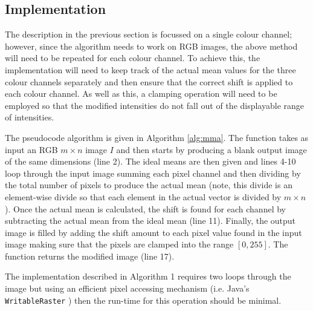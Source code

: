 \documentclass[journal,transmag]{IEEEtran}
\begin{document}
\subsection{Implementation}

The description in the previous section is focussed on a single colour channel; however, since the algorithm needs to work on RGB images, the above method will need to be repeated for each colour channel.  To achieve this, the implementation will need to keep track of the actual mean values for the three colour channels separately and then ensure that the correct shift is applied to each colour channel.  As well as this, a clamping operation will need to be employed so that the modified intensities do not fall out of the displayable range of intensities.

The pseudocode algorithm is given in Algorithm \ref{alg:mma}.  The function takes as input an RGB $m \times n$ image $I$ and then starts by producing a blank output image of the same dimensions (line 2).  The ideal means are then given and lines 4-10 loop through the input image summing each pixel channel and then dividing by the total number of pixels to produce the actual mean (note, this divide is an element-wise divide so that each element in the actual vector is divided by $m \times n$).   Once the actual mean is calculated, the shift is found for each channel by subtracting the actual mean from the ideal mean (line 11).  Finally, the output image is filled by adding the shift amount to each pixel value found in the input image making sure that the pixels are clamped into the range $[0,255]$.  The function returns the modified image (line 17).

The implementation described in Algorithm 1 requires two loops through the image but using an efficient pixel accessing mechanism (i.e. Java's \texttt{WritableRaster} \cite{JavaWR}) then the run-time for this operation should be minimal.
\end{document}
